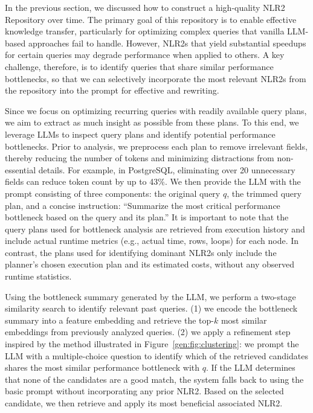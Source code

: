 In the previous section, we discussed how to construct a high-quality NLR2 Repository over time. The primary goal of this repository is to enable effective knowledge transfer, particularly for optimizing complex queries that vanilla LLM-based approaches fail to handle. However, NLR2s that yield substantial speedups for certain queries may degrade performance when applied to others. A key challenge, therefore, is to identify queries that share similar performance bottlenecks, so that we can selectively incorporate the most relevant NLR2s from the repository into the prompt for effective and  rewriting.

Since we focus on optimizing recurring queries with readily available query plans, we aim to extract as much insight as possible from these plans. To this end, we leverage LLMs to inspect query plans and identify potential performance bottlenecks. Prior to analysis, we preprocess each plan to remove irrelevant fields, thereby reducing the number of tokens and minimizing distractions from non-essential details. For example, in PostgreSQL, eliminating over 20 unnecessary fields can reduce token count by up to 43\%. We then provide the LLM with the prompt consisting of three components: the original query $q$, the trimmed query plan, and a concise instruction: “Summarize the most critical performance bottleneck based on the query and its plan.”
It is important to note that the query plans used for bottleneck analysis are retrieved from execution history and include actual runtime metrics (e.g., actual time, rows, loops) for each node. In contrast, the plans used for identifying dominant NLR2s only include the planner’s chosen execution plan and its estimated costs, without any observed runtime statistics.


Using the bottleneck summary generated by the LLM, we perform a two-stage similarity search to identify relevant past queries. (1) we encode the bottleneck summary into a feature embedding and retrieve the top-$k$ most similar embeddings from previously analyzed queries. (2) we apply a refinement step inspired by the method illustrated in Figure~\ref{gen:fig:clustering}: we prompt the LLM with a multiple-choice question to identify which of the retrieved candidates shares the most similar performance bottleneck with $q$.  If the LLM determines that none of the candidates are a good match, the system falls back to using the basic prompt without incorporating any prior NLR2. Based on the selected candidate, we then retrieve and apply its most beneficial associated NLR2.



